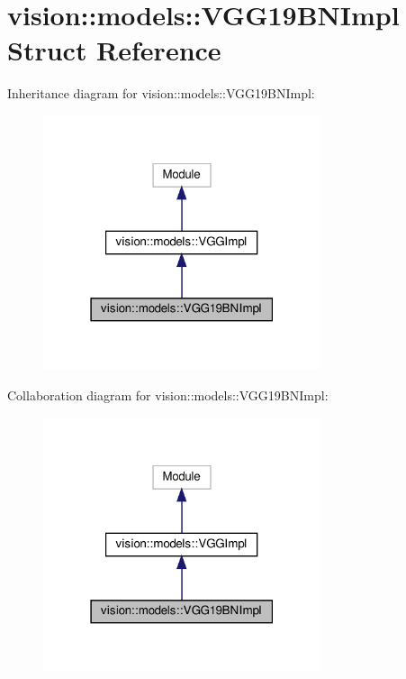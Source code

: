 \hypertarget{structvision_1_1models_1_1VGG19BNImpl}{}\section{vision\+:\+:models\+:\+:V\+G\+G19\+B\+N\+Impl Struct Reference}
\label{structvision_1_1models_1_1VGG19BNImpl}


Inheritance diagram for vision\+:\+:models\+:\+:V\+G\+G19\+B\+N\+Impl\+:
\nopagebreak
\begin{figure}[H]
\begin{center}
\leavevmode
\includegraphics[width=231pt]{structvision_1_1models_1_1VGG19BNImpl__inherit__graph}
\end{center}
\end{figure}


Collaboration diagram for vision\+:\+:models\+:\+:V\+G\+G19\+B\+N\+Impl\+:
\nopagebreak
\begin{figure}[H]
\begin{center}
\leavevmode
\includegraphics[width=231pt]{structvision_1_1models_1_1VGG19BNImpl__coll__graph}
\end{center}
\end{figure}
